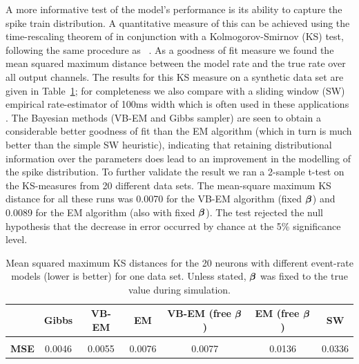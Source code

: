 \documentclass{article}
\begin{document}
A more informative test of the model's performance is its ability to capture the spike train
distribution. A quantitative measure of this can be achieved using the time-rescaling theorem of
\cite{Brown_2002} in conjunction with a Kolmogorov-Smirnov (KS) test, following the same procedure
as ~\cite{Smith_2003,Barbieri_2005}.  As a goodness of fit measure we found the mean squared maximum
distance between the model rate and the true rate over all output channels. The results for this KS
measure on a synthetic data set are given in Table~\ref{tab:MSE}; for completeness we also compare
with a sliding window (SW) empirical rate-estimator of 100ms width which is often used in these
applications \cite{Riehle_1997}. The Bayesian methods (VB-EM and Gibbs sampler) are seen to obtain a
considerable better goodness of fit than the EM algorithm (which in turn is much better than the
simple SW heuristic), indicating that retaining distributional information over the parameters does
lead to an improvement in the modelling of the spike distribution. To further validate the result we
ran a 2-sample t-test on the KS-measures from 20 different data sets. The mean-square maximum KS
distance for all these runs was 0.0070 for the VB-EM algorithm (fixed ${\bm \beta}$) and 0.0089 for the
EM algorithm (also with fixed ${\bm \beta}$). The test rejected the null hypothesis that the decrease in
error occurred by chance at the 5\% significance level.

\begin{table}[h] \caption{Mean squared maximum KS distances for the 20 neurons with different
	event-rate models (lower is better) for one data set. Unless stated, ${\bm \beta}$ was fixed to
	the true value during simulation.} \label{tab:MSE} \begin{center}
		\begin{tabular}{c|c|c|c|c|c|c} &{\bf Gibbs} &{\bf VB-EM} &{\bf EM}  & {\bf VB-EM}
			(free ${\bm \beta}$)  & {\bf EM} (free ${\bm \beta}$) &{\bf SW} \\ \hline &&&
			\\[-2ex] {\bf MSE}  & 0.0046 & 0.0055 & 0.0076  & 0.0077  &  0.0136 & 0.0336
			\\ \end{tabular} \end{center} \end{table}
\end{document}

